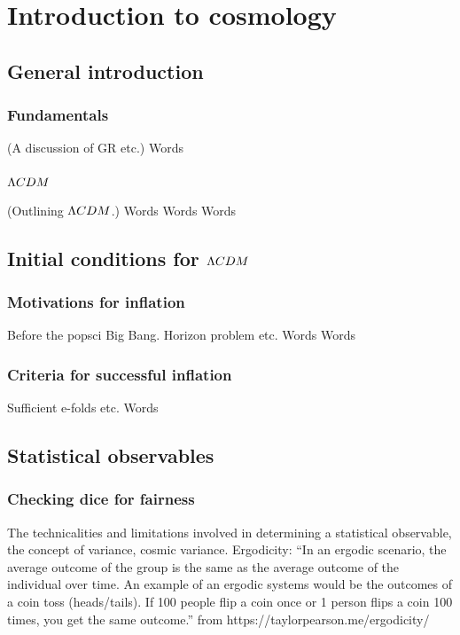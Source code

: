 %
\chapter{Introduction to cosmology}\label{chapter:intro_general}
\section{General introduction}\label{sec:general_intro}
    \subsection{Fundamentals}
    (A discussion of GR etc.)
\newpage
    Words
\newpage
    \subsection{$\Lambda CDM$}
    (Outlining $\Lambda CDM$.)
\newpage
    Words
\newpage
    Words
\newpage
    Words
\newpage
\section{Initial conditions for $\Lambda CDM$}
    \subsection{Motivations for inflation}
    Before the popsci Big Bang. Horizon problem etc.
\newpage
    Words
\newpage
    Words
\newpage
    \subsection{Criteria for successful inflation}
    Sufficient e-folds etc.
\newpage
    Words
\newpage
\section{Statistical observables}
    \subsection{Checking dice for fairness}
    The technicalities and limitations involved in determining a statistical observable,
    the concept of variance, cosmic variance.
    Ergodicity: ``In an ergodic scenario, the average outcome of the group is the same as the average outcome of the individual over time. An example of an ergodic systems would be the outcomes of a coin toss (heads/tails). If 100 people flip a coin once or 1 person flips a coin 100 times, you get the same outcome.'' from https://taylorpearson.me/ergodicity/
\newpage
